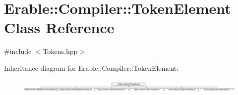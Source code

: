 \hypertarget{class_erable_1_1_compiler_1_1_token_element}{}\section{Erable\+::Compiler\+::Token\+Element Class Reference}
\label{class_erable_1_1_compiler_1_1_token_element}


{\ttfamily \#include $<$Tokens.\+hpp$>$}

Inheritance diagram for Erable\+::Compiler\+::Token\+Element\+:\begin{figure}[H]
\begin{center}
\leavevmode
\includegraphics[height=0.669056cm]{class_erable_1_1_compiler_1_1_token_element}
\end{center}
\end{figure}
